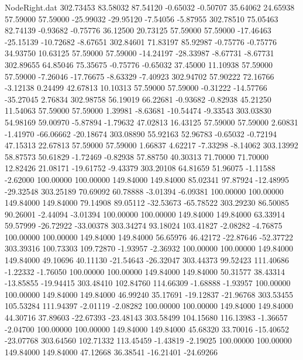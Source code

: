 \begin{filecontents}{NodeRight.dat}
 302.73453   83.58032   87.54120    -0.65032   -0.50707   35.64062   24.65938   57.59000   57.59000  -25.99032  -29.95120   -7.54056   -5.87955
 302.78510   75.05463   82.74139    -0.93682   -0.75776   36.12500   20.73125   57.59000   57.59000  -17.46463  -25.15139  -10.72682   -8.67651
 302.84601   71.83197   85.92987    -0.75776   -0.75776   34.93750   10.63125   57.59000   57.59000  -14.24197  -28.33987   -8.67731   -8.67731
 302.89655   64.85046   75.35675    -0.75776   -0.65032   37.45000   11.10938   57.59000   57.59000   -7.26046  -17.76675   -8.63329   -7.40923
 302.94702   57.90222   72.16766    -3.12138    0.24499   42.67813   10.10313   57.59000   57.59000   -0.31222  -14.57766  -35.27045    2.76834
 302.98758   56.19019   66.22681    -0.93682   -0.82938   45.21250   11.54063   57.59000   57.59000    1.39981   -8.63681  -10.54474   -9.33543
 303.03830   54.98169   59.00970    -5.87894   -1.79632   47.02813   16.43125   57.59000   57.59000    2.60831   -1.41970  -66.06662  -20.18674
 303.08890   55.92163   52.96783    -0.65032   -0.72194   47.15313   22.67813   57.59000   57.59000    1.66837    4.62217   -7.33298   -8.14062
 303.13992   58.87573   50.61829    -1.72469   -0.82938   57.88750   40.30313   71.70000   71.70000   12.82426   21.08171  -19.61752   -9.43379
 303.20108   64.81659   51.96075    -1.11588   -2.62000  100.00000  100.00000  149.84000  149.84000   85.02341   97.87924  -12.48995  -29.32548
 303.25189   70.69092   60.78888    -3.01394   -6.09381  100.00000  100.00000  149.84000  149.84000   79.14908   89.05112  -32.53673  -65.78522
 303.29230   86.50085   90.26001    -2.44094   -3.01394  100.00000  100.00000  149.84000  149.84000   63.33914   59.57999  -26.72922  -33.00378
 303.34274   93.18024  103.41827    -2.08282   -4.76875  100.00000  100.00000  149.84000  149.84000   56.65976   46.42172  -22.87646  -52.37722
 303.39316  100.73303  109.72870    -1.93957   -2.36932  100.00000  100.00000  149.84000  149.84000   49.10696   40.11130  -21.54643  -26.32047
 303.44373   99.52423  111.40686    -1.22332   -1.76050  100.00000  100.00000  149.84000  149.84000   50.31577   38.43314  -13.85855  -19.94415
 303.48410  102.84760  114.66309    -1.68888   -1.93957  100.00000  100.00000  149.84000  149.84000   46.99240   35.17691  -19.12837  -21.96768
 303.53455  105.53284  111.94397    -2.01119   -2.08282  100.00000  100.00000  149.84000  149.84000   44.30716   37.89603  -22.67393  -23.48143
 303.58499  104.15680  116.13983    -1.36657   -2.04700  100.00000  100.00000  149.84000  149.84000   45.68320   33.70016  -15.40652  -23.07768
 303.64560  102.71332  113.45459    -1.43819   -2.19025  100.00000  100.00000  149.84000  149.84000   47.12668   36.38541  -16.21401  -24.69266

\end{filecontents}

